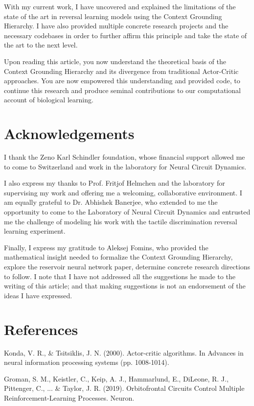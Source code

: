 \documentclass[11pt]{article}
\begin{document}
With my current work, I have uncovered and explained the limitations of the state of the art in reversal learning models using the Context Grounding Hierarchy.  I have also provided multiple concrete research projects and the necessary codebases in order to further affirm this principle and take the state of the art to the next level.

\newpage

Upon reading this article, you now understand the theoretical basis of the Context Grounding Hierarchy and its divergence from traditional Actor-Critic approaches. You are now empowered this understanding and provided code, to continue this research and produce seminal contributions to our computational account of biological learning.

\section{Acknowledgements}

I thank the Zeno Karl Schindler foundation, whose financial support allowed me to come to Switzerland and work in the laboratory for Neural Circuit Dynamics.

I also express my thanks to Prof. Fritjof Helmchen and the laboratory for supervising my work and offering me a welcoming, collaborative environment.  I am equally grateful to Dr. Abhishek Banerjee, who extended to me the opportunity to come to the Laboratory of Neural Circuit Dynamics and entrusted me the challenge of modeling his work with the tactile discrimination reversal learning experiment.

Finally, I express my gratitude to Aleksej Fomins, who provided the mathematical insight needed to formalize the Context Grounding Hierarchy, explore the reservoir neural network paper, determine concrete research directions to follow.  I note that I have not addressed all the suggestions he made to the writing of this article; and that making suggestions is not an endorsement of the ideas I have expressed.

\newpage
\section{References}

Konda, V. R., \& Tsitsiklis, J. N. (2000). Actor-critic algorithms. In Advances in neural information processing systems (pp. 1008-1014).

Groman, S. M., Keistler, C., Keip, A. J., Hammarlund, E., DiLeone, R. J., Pittenger, C., ... \& Taylor, J. R. (2019). Orbitofrontal Circuits Control Multiple Reinforcement-Learning Processes. Neuron.
\end{document}
